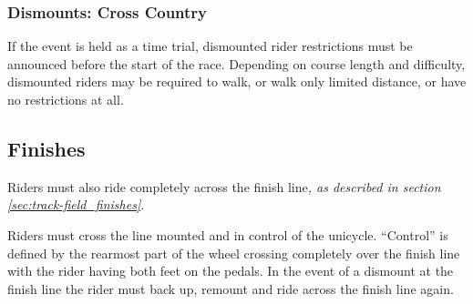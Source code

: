 \subsubsection{Dismounts: Cross Country}

If the event is held as a time trial, dismounted rider restrictions must be announced before the start of the race.
Depending on course length and difficulty, dismounted riders may be required to walk, or walk only limited distance, or have no restrictions at all.

\subsection{Finishes}

Riders must also ride completely across the finish line\textit{, as described in section \ref{sec:track-field_finishes}}. 

Riders must cross the line mounted and in control of the unicycle.
``Control'' is defined by the rearmost part of the wheel crossing completely over the finish line with the rider having both feet on the pedals.
In the event of a dismount at the finish line the rider must back up, remount and ride across the finish line again.
